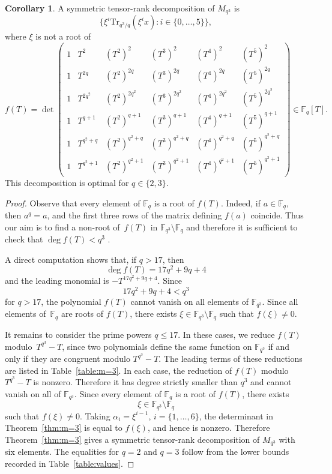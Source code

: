 \documentclass[11pt,a4paper,reqno]{article}
\numberwithin{equation}{section}
\theoremstyle{definition}
\newtheorem{corollary}[theorem]{Corollary}
\begin{document}
\begin{corollary}\label{cor:m=3}
A symmetric tensor-rank
decomposition of \(M_{q^3}\) is
\[ \{\xi^i\mathrm{Tr}_{q^3/q}(\xi^i x) : i \in \{0,\ldots,5\}\}, \]
where $\xi$ is not a root of 
\begin{equation}\label{eq:f(T)}
f(T)=
\det
\begin{pmatrix}
1 & T^2 & (T^2)^2 & (T^3)^2 & (T^4)^2 & (T^5)^2\\
1 & T^{2q} & (T^2)^{2q} & (T^3)^{2q} & (T^4)^{2q} & (T^5)^{2q}\\
1 & T^{2q^2} & (T^2)^{2q^2} & (T^3)^{2q^2} & (T^4)^{2q^2} & (T^5)^{2q^2}\\
1 & T^{q+1} & (T^2)^{q+1} & (T^3)^{q+1} & (T^4)^{q+1} & (T^5)^{q+1}\\
1 & T^{q^2+q} & (T^2)^{q^2+q} & (T^3)^{q^2+q} & (T^4)^{q^2+q} & (T^5)^{q^2+q}\\
1 & T^{q^2+1} & (T^2)^{q^2+1} & (T^3)^{q^2+1} & (T^4)^{q^2+1} & (T^5)^{q^2+1}
\end{pmatrix}
\in \mathbb F_q[T].
\end{equation}
This decomposition is optimal for $q \in \{2,3\}$.
\end{corollary}
\begin{proof}
Observe that every element of \(\mathbb F_q\) is a root of \(f(T)\). Indeed,
if \(a\in\mathbb F_q\), then \(a^q=a\), and the first three rows of the
matrix defining \(f(a)\) coincide. Thus our aim is to find a non-root of~\(f(T)\) in \(\mathbb F_{q^3}\setminus\mathbb F_q\) and therefore it is sufficient to check that $\deg f(T)<q^3$ .

A direct computation shows that, if \(q>17\), then
\[
\deg f(T)=17q^2+9q+4
\]
and the leading monomial is \(-T^{17q^2+9q+4}\). Since
\[
17q^2+9q+4<q^3
\]
for \(q>17\), the polynomial \(f(T)\) cannot vanish on all elements of
\(\mathbb F_{q^3}\). Since all elements of~\(\mathbb F_q\) are roots of
\(f(T)\), there exists $\xi\in \mathbb F_{q^3}\setminus\mathbb F_q$ such that \(f(\xi)\ne 0\).

It remains to consider the prime powers \(q\le 17\). In these cases, we reduce
\(f(T)\) modulo~\(T^{q^3}-T\), since two polynomials define the same function
on \(\mathbb F_{q^3}\) if and only if they are congruent modulo \(T^{q^3}-T\).
The leading terms of these reductions are listed in Table~\ref{table:m=3}.
In each case, the reduction of \(f(T)\) modulo \(T^{q^3}-T\) is nonzero.
Therefore it has degree strictly smaller than \(q^3\) and cannot vanish on all
of \(\mathbb F_{q^3}\). Since every element of \(\mathbb F_q\) is a root of
\(f(T)\), there exists
\[
\xi\in \mathbb F_{q^3}\setminus\mathbb F_q
\]
such that \(f(\xi)\ne 0\). Taking $\alpha_i=\xi^{i-1}$, $i=\{1,\ldots,6\}$, the determinant in Theorem~\ref{thm:m=3} is equal to \(f(\xi)\), and hence is
nonzero. Therefore Theorem~\ref{thm:m=3} gives a symmetric tensor-rank
decomposition of \(M_{q^3}\) with six elements. The equalities for
\(q=2\) and \(q=3\) follow from the lower bounds recorded in
Table~\ref{table:values}.
\end{proof}
\end{document}
